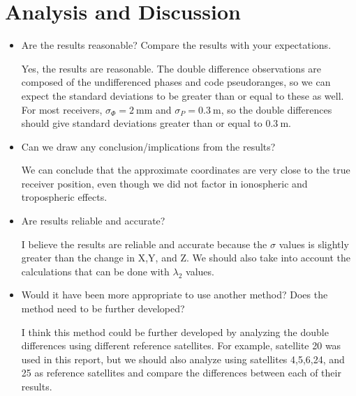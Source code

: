 

\section{Analysis and Discussion} %
\label{sec:analysis_and_discussion}
\begin{itemize}
	\item Are the results reasonable? Compare the results with your expectations.
	
	Yes, the results are reasonable.  The double difference observations are composed of the undifferenced phases and code pseudoranges, so we can expect the standard deviations to be greater than or equal to these as well.  For most receivers, $\sigma_{\Phi}=2~\text{mm}$ and $\sigma_P = 0.3~\text{m}$, so the double differences should give standard deviations greater than or equal to $0.3~\text{m}$.  
	\item Can we draw any conclusion/implications from the results?  
	
	We can conclude that the approximate coordinates are very close to the true receiver position, even though we did not factor in ionospheric and tropospheric effects.  
	\item Are results reliable and accurate?
	
	I believe the results are reliable and accurate because the $\sigma$ values is slightly greater than the change in X,Y, and Z.  We should also take into account the calculations that can be done with $\lambda_2$ values. %
	
	\item Would it have been more appropriate to use another method? Does the method need to be further developed?
	
	I think this method could be further developed by analyzing the double differences using different reference satellites.  For example, satellite 20 was used in this report, but we should also analyze using satellites 4,5,6,24, and 25 as reference satellites and compare the differences between each of their results.
\end{itemize}

